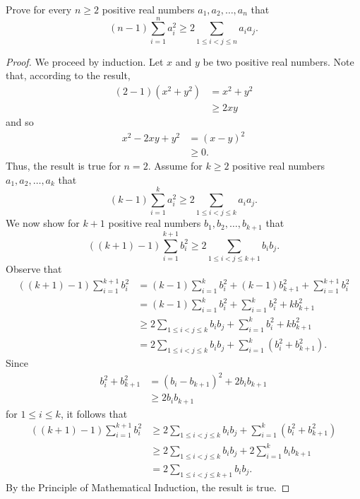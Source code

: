 \documentclass[12pt]{article}
\newenvironment{problem}[2][Problem]{\begin{trivlist}
		\item[\hskip \labelsep {\bfseries #1}\hskip \labelsep {\bfseries #2.}]}{\end{trivlist}}
\begin{document}
\begin{problem}{32}
	Prove for every $n\geq 2$ positive real numbers $a_{1}, a_{2}, \ldots, a_{n}$ that 
	\begin{equation*}
		(n-1)\sum_{i=1}^{n}a_{i}^{2} \geq 2 \sum_{1\leq i < j \leq n} a_{i}a_{j}.
	\end{equation*}
\begin{proof}
	We proceed by induction. Let $x$ and $y$ be two positive real numbers. Note that, according to the result, 
	\begin{align*}
		(2-1)(x^{2}+y^{2}) &= x^{2}+y^{2}\\
		&\geq 2xy 
	\end{align*}
	and so
	\begin{align*}
		x^{2}-2xy+y^{2} &= (x-y)^{2}\\
		&\geq 0.
	\end{align*}
	Thus, the result is true for $n=2$. Assume for $k\geq 2$ positive real numbers $a_{1},a_{2},\ldots,a_{k}$ that
	\begin{equation*}
			(k-1)\sum_{i=1}^{k}a_{i}^{2} \geq 2 \sum_{1\leq i < j \leq k} a_{i}a_{j}.
	\end{equation*}
	We now show for $k+1$ positive real numbers $b_{1}, b_{2}, \ldots, b_{k+1}$ that
	\begin{equation*}
		((k+1)-1)\sum_{i=1}^{k+1}b_{i}^{2} \geq 2 \sum_{1\leq i < j \leq k+1} b_{i}b_{j}.
	\end{equation*}
	Observe that
	\begin{align*}
		((k+1)-1)\sum_{i=1}^{k+1}b_{i}^{2} &= (k-1)\sum_{i=1}^{k}b_{i}^{2} + (k-1)b_{k+1}^{2}+\sum_{i=1}^{k+1}b_{i}^{2}\\
		&= (k-1)\sum_{i=1}^{k}b_{i}^{2} + \sum_{i=1}^{k}b_{i}^{2} + kb^{2}_{k+1}\\ 
		&\geq 2 \sum_{1\leq i < j \leq k} b_{i}b_{j}  + \sum_{i=1}^{k}b_{i}^{2} + kb^{2}_{k+1}\\
		&= 2 \sum_{1\leq i < j \leq k} b_{i}b_{j}  + \sum_{i=1}^{k}(b_{i}^{2}+b^{2}_{k+1}).
	\end{align*}
Since   
\begin{align*}
b_{i}^{2}+b^{2}_{k+1} &= (b_{i}-b_{k+1})^{2} + 2b_{i}b_{k+1}\\ &\geq 2b_{i}b_{k+1}
\end{align*}
for $1\leq i \leq k$, it follows that
	\begin{align*}
			((k+1)-1)\sum_{i=1}^{k+1}b_{i}^{2} &\geq 2 \sum_{1\leq i < j \leq k} b_{i}b_{j}  + \sum_{i=1}^{k}(b_{i}^{2}+b^{2}_{k+1})\\
			&\geq 2 \sum_{1\leq i < j \leq k} b_{i}b_{j}  + 2\sum_{i=1}^{k}b_{i}b_{k+1} \\
			&= 2 \sum_{1\leq i < j \leq k+1} b_{i}b_{j}.
	\end{align*}
By the Principle of Mathematical Induction, the result is true.
\end{proof}
\end{problem}
\end{document}
